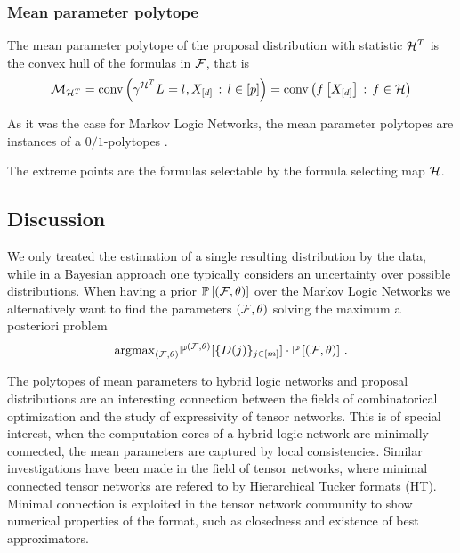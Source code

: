 \subsubsection{Mean parameter polytope}

The mean parameter polytope of the proposal distribution with statistic $\mathcal{H}^T$ is the convex hull of the formulas in $\mathcal{F}$, that is
\begin{align*}
	\mathcal{M}_{\mathcal{H}^T}
	= \mathrm{conv}\left(\gamma^{\mathcal{H}^T}{L_{}=l_{},X_{[d]}} \, : \, l\in[p]{}\right)
	= \mathrm{conv}\left(f\left[X_{[d]}\right] \, : \, f\in\mathcal{H}\right)
\end{align*}


As it was the case for Markov Logic Networks, the mean parameter polytopes are instances of a $0/1$-polytopes \cite{ziegler_lectures_2000,gillmann_01-polytopes_2007}.

The extreme points are the formulas selectable by the formula selecting map $\mathcal{H}$.


\subsection{Discussion}

\begin{remark}
	We only treated the estimation of a single resulting distribution by the data, while in a Bayesian approach one typically considers an uncertainty over possible distributions.
	When having a prior $\mathbb{P}\left[(\mathcal{F},\theta)\right]$ over the Markov Logic Networks we alternatively want to find the parameters $(\mathcal{F},\theta)$ solving the maximum a posteriori problem
	\begin{align}
		\mathrm{argmax}_{(\mathcal{F},\theta)} \mathbb{P}^{(\mathcal{F},\theta)}[\{D(j)\}_{j\in[m]}]\cdot \mathbb{P}\left[(\mathcal{F},\theta)\right]\, .
	\end{align}
\end{remark}


The polytopes of mean parameters to hybrid logic networks and proposal distributions are an interesting connection between the fields of combinatorical optimization and the study of expressivity of tensor networks.
This is of special interest, when the computation cores of a hybrid logic network are minimally connected, the mean parameters are captured by local consistencies.
Similar investigations have been made in the field of tensor networks, where minimal connected tensor networks are refered to by Hierarchical Tucker formats (HT).
Minimal connection is exploited in the tensor network community to show numerical properties of the format, such as closedness and existence of best approximators.
















